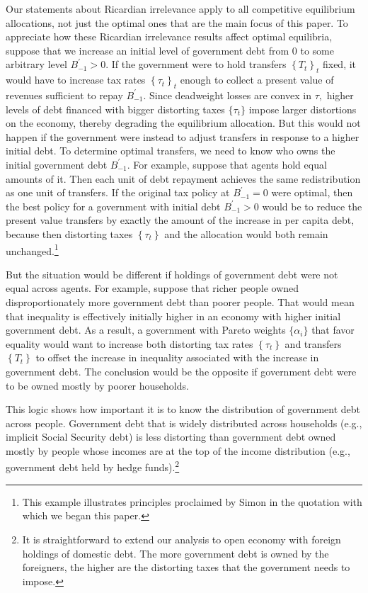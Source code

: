 \documentclass[thmsb,11pt]{article}
\begin{document}
Our statements about Ricardian irrelevance apply to all competitive equilibrium allocations,
not just the optimal ones that are the main focus of this paper.
To appreciate how  these  Ricardian irrelevance results affect optimal equilibria, suppose that we increase an
initial level of government debt from $0$ to some arbitrary level $%
B_{-1}^{\prime } > 0$. If the government were to hold transfers $\left\{ T_{t}\right\} _{t}$ fixed, it would
 have  to increase  tax rates $\left\{ \tau
_{t}\right\} _{t}$ enough to collect a present value of revenues sufficient to
repay $B_{-1}^{\prime }$. Since deadweight losses are convex in $\tau ,$
higher levels of debt financed with bigger distorting taxes $\{\tau_t\}$  impose larger
distortions on the economy, thereby degrading the equilibrium allocation.  But this would not happen  if
the government were instead  to adjust transfers in response to a higher initial debt. To determine optimal transfers, we need to
know who owns  the initial government debt $B_{-1}^{\prime }$. For example, suppose that agents hold equal amounts of it. Then
each unit of debt repayment achieves the same redistribution as one
unit of transfers. If the original tax policy  at $B_{-1}^{\prime } =0 $ were optimal, then  the best policy for a government with  initial debt $%
B_{-1}^{\prime } >0 $ would be to reduce the present value  transfers by exactly the amount of the
increase in per capita debt, because then distorting taxes $\left\{ \tau
_{t}\right\} $ and the allocation would both remain unchanged.\footnote{This example illustrates
principles proclaimed by Simon \citet[p. 85]{newcomb1865critical} in the quotation with
which we began this paper.}

But the situation would be different if  holdings of government
debt were not equal across agents. For example, suppose  that  richer people owned disproportionately more government debt
than poorer people. That would mean that inequality
is  effectively initially  higher in an economy with higher initial government debt. As a result, a
government with Pareto weights $\{\alpha_i\}$ that favor equality would want to increase both  distorting  tax rates $\left\{ \tau _{t}\right\} $
and transfers $\left\{ T_{t}\right\} $ to offset the increase in inequality
associated with the increase in government debt. The conclusion would be the
opposite if government debt were to be  owned mostly by poorer
households.



This logic shows how important it is to know the distribution of government debt across people. Government debt that is widely distributed across households
(e.g., implicit Social Security debt) is less distorting than
 government debt owned mostly by people whose incomes are at the top of the income
distribution (e.g., government debt held by hedge funds).\footnote{%
It is straightforward to extend our analysis to open economy with foreign
holdings of domestic debt. The more government debt is owned by the
foreigners, the higher are the distorting taxes that  the government  needs to
impose.}
\end{document}
